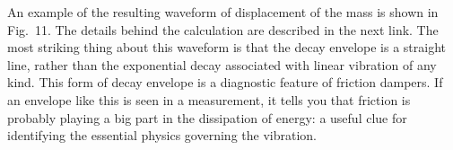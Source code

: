   An example of the resulting waveform of displacement of the mass is shown in 
  Fig.\ 11. The details behind the calculation are described in the next link. 
  The most striking thing about this waveform is that the decay envelope is a 
  straight line, rather than the exponential decay associated with linear 
  vibration of any kind. This form of decay envelope is a diagnostic feature of 
  friction dampers. If an envelope like this is seen in a measurement, it tells 
  you that friction is probably playing a big part in the dissipation of 
  energy: a useful clue for identifying the essential physics governing the 
  vibration. 


